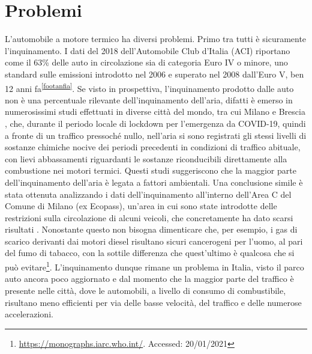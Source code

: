 \section{Problemi}

L'automobile a motore termico ha diversi problemi. Primo tra tutti è sicuramente l'inquinamento. I dati del 2018 dell'Automobile Club d'Italia (ACI) riportano come il 63\% delle auto in circolazione sia di categoria Euro IV o minore, uno standard sulle emissioni introdotto nel 2006 e superato nel 2008 dall'Euro V, ben 12 anni fa\textsuperscript{\ref{footanfia}}. Se visto in prospettiva, l'inquinamento prodotto dalle auto non è una percentuale rilevante dell'inquinamento dell'aria, difatti è emerso in numerosissimi studi effettuati in diverse città del mondo, tra cui Milano e Brescia \cite{collivignarelli2021analysis}\cite{cameletti2020effect}, che, durante il periodo locale di lockdown per l'emergenza da COVID-19,  quindi a fronte di un traffico pressoché nullo, nell'aria si sono registrati gli stessi livelli di sostanze chimiche nocive dei periodi precedenti in condizioni di traffico abituale, con lievi abbassamenti riguardanti le sostanze riconducibili direttamente alla combustione nei motori termici. Questi studi suggeriscono che la maggior parte dell'inquinamento dell'aria è legata a fattori ambientali. Una conclusione simile è stata ottenuta analizzando i dati dell'inquinamento all'interno dell'Area C del Comune di Milano (ex Ecopass), un'area in cui sono state introdotte delle restrizioni sulla circolazione di alcuni veicoli, che concretamente ha dato scarsi risultati \cite{trentini2014lombardy}. Nonostante questo non bisogna dimenticare che, per esempio, i gas di scarico derivanti dai motori diesel risultano sicuri cancerogeni per l'uomo, al pari del fumo di tabacco, con la sottile differenza che quest'ultimo è qualcosa che si può evitare\footnote{\url{https://monographs.iarc.who.int/}. Accessed: 20/01/2021}. L'inquinamento dunque rimane un problema in Italia, visto il parco auto ancora poco aggiornato e dal momento che la maggior parte del traffico è presente nelle città, dove le automobili, a livello di consumo di combustibile, risultano meno efficienti per via delle basse velocità, del traffico e delle numerose accelerazioni.


